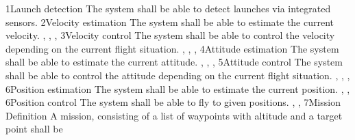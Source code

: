 \documentclass{scrartcl}
\begin{document}
\req
    {1}{Launch detection}
    {
        The system shall be able to detect launches via integrated sensors.
    }
    {
    }
    {}
\req
    {2}{Velocity estimation}
    {
        The system shall be able to estimate the current velocity.   
    }
    {
        , , , 
    }
    {}
\req
    {3}{Velocity control}
    {
        The system shall be able to control the velocity depending on
        the current flight situation.
    }
    {
        , , , 
    }
    {}
\req
    {4}{Attitude estimation}
    {
        The system shall be able to estimate the current attitude.   
    }
    {
        , , , 
    }
    {}
\req
    {5}{Attitude control}
    {
        The system shall be able to control the attitude depending on
        the current flight situation.
    }
    {
        , , , 
    }
    {}
\req
    {6}{Position estimation}
    {
        The system shall be able to estimate the current position.
    }
    {
        , , 
    }
    {}
\req
    {6}{Position control}
    {
        The system shall be able to fly to given positions.
    }
    {
        , , 
    }
    {}
\req
    {7}{Mission Definition}
    {
        A mission, consisting of a list of waypoints with altitude
        and a target point shall be 
    }{}{}
\end{document}
